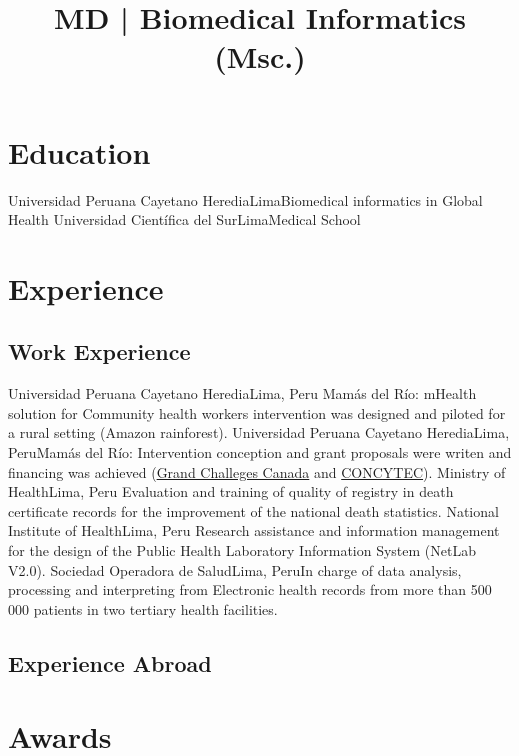 \documentclass[11pt,a4paper,sans]{moderncv}
\title{MD | Biomedical Informatics (Msc.) }
\begin{document}
\makecvtitle

\section{Education}
{Universidad Peruana Cayetano Heredia}{Lima}{}{Biomedical informatics in Global Health}
{Universidad Científica del Sur}{Lima}{}{Medical School}  

\section{Experience}
\subsection{Work Experience}
{Universidad Peruana Cayetano Heredia}{Lima, Peru}{}
{Mamás del Río: mHealth solution for Community health workers intervention was designed and piloted for a rural setting (Amazon rainforest).}
{Universidad Peruana Cayetano Heredia}{Lima, Peru}{}{Mamás del Río: Intervention conception and grant proposals were writen and financing was achieved (\href{https://www.grandchallenges.ca/}{Grand Challeges Canada} and \href{https://portal.concytec.gob.pe/}{CONCYTEC}).} 
{Ministry of Health}{Lima, Peru}{}
{Evaluation and training of quality of registry in death certificate records for the improvement of the national death statistics.} 
{National Institute of Health}{Lima, Peru}{}
{Research assistance and information management for the design of the Public Health Laboratory Information System (NetLab V2.0).} 
{Sociedad Operadora de Salud}{Lima, Peru}{}{In charge of data analysis, processing and interpreting from Electronic health records from more than 500 000 patients in two tertiary health facilities.} 
\subsection{Experience Abroad}
\newpage

\section{Awards}
\end{document}
